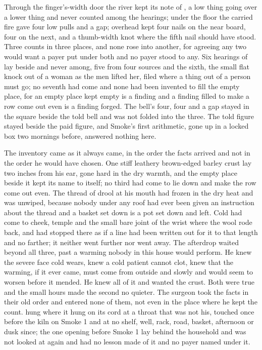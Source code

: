 Through the finger's-width door the river kept its note of , a low thing going over a lower thing and never counted among the hearings; under the floor the carried fire gave four low pulls and a gap; overhead  kept four nails on the near board, four on the next, and a thumb-width knot where the fifth nail should have stood. Three counts in three places, and none rose into another, for agreeing any two would want a payer put under both and no payer stood to any. Six hearings of  lay beside and never among, five from four sources and the sixth, the small flat knock out of a woman as the men lifted her, filed where a thing out of a person must go; no seventh had come and none had been invented to fill the empty place, for an empty place kept empty is a finding and a finding filled to make a row come out even is a finding forged. The bell's four, four and a gap stayed in the square beside the told bell and was not folded into the three. The told figure stayed beside the paid figure, and Smoke's first arithmetic, gone up  in a locked box two mornings before, answered nothing here.

The inventory came as it always came, in the order the facts arrived and not in the order he would have chosen. One stiff leathery brown-edged barley crust lay two inches from his ear, gone hard in the dry warmth, and the empty place beside it kept its name to itself; no third had come to lie down and make the row come out even. The thread of drool at his mouth had frozen in the dry heat and was unwiped, because nobody under any roof had ever been given an instruction about the thread and a basket set down is a pot set down and left. Cold had come to cheek, temple and the small bare joint of the wrist where the wool rode back, and had stopped there as if a line had been written out for it to that length and no farther; it neither went further nor went away. The afterdrop waited beyond all three, past a warming nobody in this house would perform. He knew the severe face cold wears, knew a cold patient cannot clot, knew that the warming, if it ever came, must come from outside and slowly and would seem to worsen before it mended. He knew all of it and wanted the crust. Both were true and the small hours made the second no quieter. The surgeon took the facts in their old order and entered none of them, not even in the place where he kept the count.  hung where it hung on its cord at a throat that was not his, touched once before the kiln on Smoke 1 and at no shelf, well, rack, road, basket, afternoon or dusk since; the one opening before Smoke 1 lay behind the household and was not looked at again and had no lesson made of it and no payer named under it.

